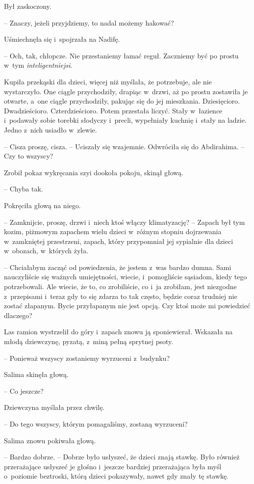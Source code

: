 \documentclass[oneside,polish,11pt,sfheadings]{mwbk}
\begin{document}
Był zaskoczony. 

-- Znaczy, jeżeli przyjdziemy, to nadal możemy hakować?

Uśmiechnęła się i~spojrzała na Nadifę. 

-- Och, tak, chłopcze. Nie
przestaniemy łamać reguł. Zaczniemy być po prostu w~tym
\textit{inteligentniejsi}.

Kupiła przekąski dla dzieci, więcej niż myślała, że potrzebuje, ale nie
wystarczyło. One ciągle przychodziły, drapiąc w~drzwi, aż po prostu
zostawiła je otwarte, a~one ciągle przychodziły, pakując się do jej
mieszkania. Dziesięcioro. Dwadzieścioro. Czterdzieścioro. Potem
przestała liczyć. Stały w~łazience i~podawały sobie torebki słodyczy i~precli, wypełniały kuchnię i~stały na ladzie. Jedno z~nich usiadło w~zlewie.

-- Cisza proszę, cisza. -- Uciszały się wzajemnie. Odwróciła się do
Abdirahima. -- Czy to wszyscy?

Zrobił pokaz wykręcania szyi dookoła pokoju, skinął głową. 

-- Chyba tak.

Pokręciła głową na niego. 

-- Zamknijcie, proszę, drzwi i~niech ktoś
włączy klimatyzację? -- Zapach był tym kozim, piżmowym zapachem wielu
dzieci w~różnym stopniu dojrzewania w~zamkniętej przestrzeni, zapach,
który przypomniał jej sypialnie dla dzieci w~obozach, w~których żyła.

-- Chciałabym zacząć od powiedzenia, że jestem z~was bardzo dumna. Sami
nauczyliście się ważnych umiejętności, wiecie, i~pomogliście sąsiadom,
kiedy tego potrzebowali. Ale wiecie, że to, co zrobiliście, co i~ja
zrobiłam, jest niezgodne z~przepisami i~teraz gdy to się zdarza to tak
często, będzie coraz trudniej nie zostać złapanym. Bycie przyłapanym nie
jest opcją. Czy ktoś może mi powiedzieć dlaczego?

Las ramion wystrzelił do góry i~zapach znowu ją sponiewierał. Wskazała
na młodą dziewczynę, pyzatą, z~miną pełną sprytnej psoty. 

-- Ponieważ
wszyscy zostaniemy wyrzuceni z~budynku?

Salima skinęła głową. 

-- Co jeszcze?

Dziewczyna myślała przez chwilę. 

-- Do tego wszyscy, którym pomagaliśmy,
zostaną wyrzuceni?

Salima znowu pokiwała głową. 

-- Bardzo dobrze. -- Dobrze było usłyszeć, że
dzieci znają stawkę. Było również przerażające usłyszeć je głośno i~jeszcze bardziej przerażająca była myśl o~poziomie beztroski, którą
dzieci pokazywały, nawet gdy znały tę stawkę.
\end{document}
